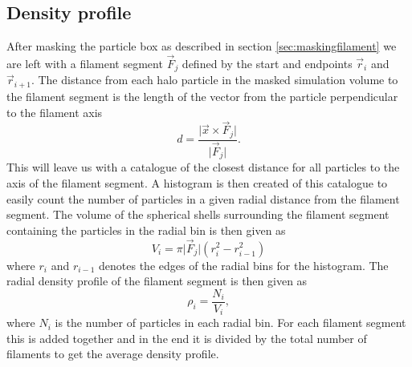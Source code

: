\subsection{Density profile}\label{sec:filamentdensity}
After masking the particle box as described in section \ref{sec:maskingfilament}
we are left with a filament segment $\vec{F}_j$ defined by the start and
endpoints $\vec{r}_{i}$ and $\vec{r}_{i+1}$. The distance from each halo particle in
the masked simulation volume to the filament segment is the length of the vector
from the particle perpendicular to the filament axis
\begin{equation}\label{eq:distance_from_filament}
    d=\frac{\vert \vec{x}\times\vec{F}_j\vert}{\vert \vec{F}_j\vert}.
\end{equation}
This will leave us with a catalogue of the closest distance for all particles to
the axis of the filament segment. A histogram is then created of this catalogue
to easily count the number of particles in a given radial distance from the
filament segment. The volume of the spherical shells surrounding the filament segment
containing the particles in the radial bin is then given as
\begin{equation}
    V_i={\pi\vert \vec{F}_j\vert(r_i^2-r_{i-1}^2)}
\end{equation}
where $r_i$ and $r_{i-1}$ denotes the edges of the radial bins for the histogram.
The radial density profile of the filament segment is then given as
\begin{equation}
    \rho_i=\frac{N_i}{V_i},
\end{equation}
where $N_i$ is the number of particles in each radial bin. For each filament segment
this is added together and in the end it is divided by the total number of
filaments to get the average density profile.

